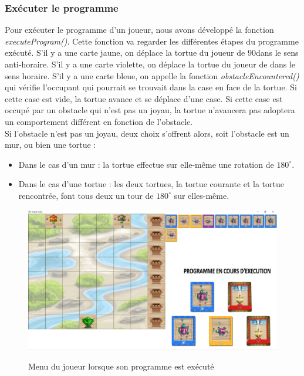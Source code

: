 \documentclass{article}
\begin{document}
\newpage

		\subsubsection{Exécuter le programme}
\indent Pour exécuter le programme d'un joueur, nous avons développé la fonction \textit{executeProgram()}.  Cette fonction va regarder les différentes étapes du programme exécuté. S'il y a une carte jaune, on déplace la tortue du joueur de 90\degree dans le sens anti-horaire.  S'il y a une carte violette, on déplace la tortue du joueur de \degree dans le sens horaire. S'il y a une carte bleue, on appelle la fonction \textit{obstacleEncountered()} qui vérifie l'occupant qui pourrait se trouvait dans la case en face de la tortue. Si cette case est vide, la tortue avance et se déplace d'une case. Si cette case est occupé par un obstacle qui n'est pas un joyau, la tortue n'avancera pas adoptera un comportement différent en fonction de l'obstacle. \\
Si l'obstacle n'est pas un joyau, deux choix s'offrent alors, soit l'obstacle est un mur, ou bien une tortue :
\begin{itemize}
\item Dans le cas d'un mur : la tortue effectue sur elle-même une rotation de $180^\circ$.
\item Dans le cas d'une tortue : les deux tortues, la tortue courante et la tortue rencontrée, font tous deux un tour de $180^\circ$ sur elles-même.
\end{itemize} 

\begin{figure}[h]
	\begin{center}
		\includegraphics[scale=0.2]{../img/programme_execution} \\
	\end{center}
	\caption{Menu du joueur lorsque son programme est exécuté}
\end{figure}
\end{document}
